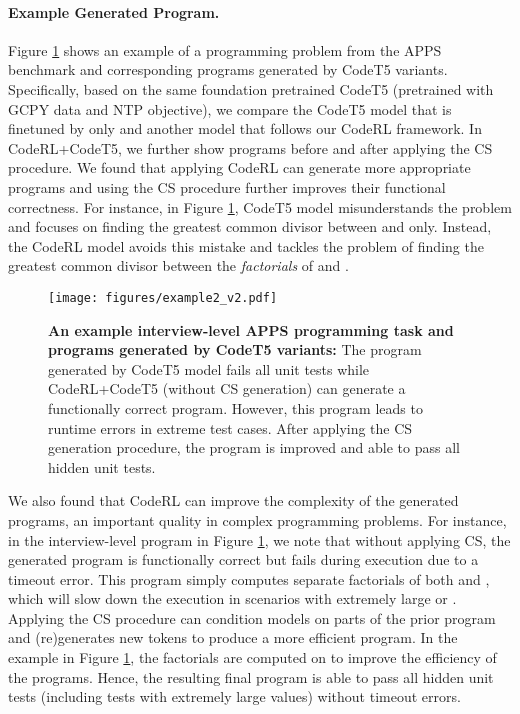 \documentclass{article}
\begin{document}
\paragraph{Example Generated Program.}
Figure \ref{app_fig:example_program2} shows an example of a programming problem from the APPS benchmark and corresponding programs generated by CodeT5 variants. 
Specifically, based on the same foundation pretrained CodeT5 (pretrained with GCPY data and NTP objective), we compare the CodeT5 model that is finetuned by  only and another model that follows our CodeRL framework.
In CodeRL+CodeT5, we further show programs before and after applying the CS procedure. 
We found that applying CodeRL can generate more appropriate programs and using the CS procedure further improves their functional correctness. 
For instance, in Figure \ref{app_fig:example_program2}, CodeT5 model misunderstands the problem and focuses on finding the greatest common divisor between  and  only.
Instead, the CodeRL model avoids this mistake and tackles the problem of finding the greatest common divisor between the \emph{factorials} of  and .

\begin{figure}[t]
	\centering
	\resizebox{1.0\textwidth}{!} {
	\texttt{[image: figures/example2\_v2.pdf]}
	}
	\caption{
	\textbf{An example interview-level APPS programming task and programs generated by CodeT5 variants:}
	The program generated by CodeT5 model fails all unit tests while CodeRL+CodeT5 (without CS generation) can generate a functionally correct program.
	However, this program leads to runtime errors in extreme test cases.
	After applying the CS generation procedure, the program is improved and able to pass all hidden unit tests. 
	}
	\label{app_fig:example_program2}
\end{figure}

We also found that CodeRL can improve the complexity of the generated programs, an important quality in complex programming problems. 
For instance, in the interview-level program in Figure \ref{app_fig:example_program2}, we note that without applying CS, the generated program is functionally correct but fails during execution due to a timeout error.
This program simply computes separate factorials of both  and , which will slow down the execution in scenarios with extremely large  or . 
Applying the CS procedure can condition models on parts of the prior program and (re)generates new tokens to produce a more efficient program.
In the example in Figure \ref{app_fig:example_program2}, the factorials are computed on  to improve the efficiency of the programs. 
Hence, the resulting final program is able to pass all hidden unit tests (including tests with extremely large values) without timeout errors. 
\end{document}
